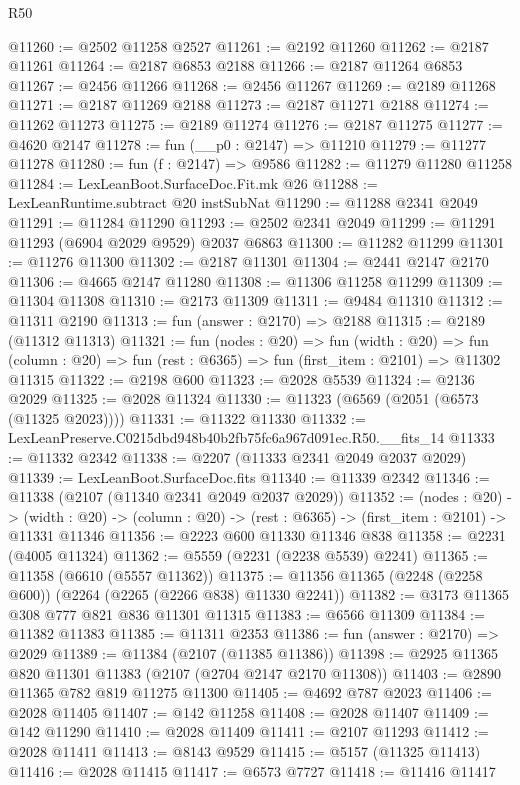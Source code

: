 \begin{lexlean}{R50}
\begin{coremodule}
@11260 := @2502 @11258 @2527
@11261 := @2192 @11260
@11262 := @2187 @11261
@11264 := @2187 @6853 @2188
@11266 := @2187 @11264 @6853
@11267 := @2456 @11266
@11268 := @2456 @11267
@11269 := @2189 @11268
@11271 := @2187 @11269 @2188
@11273 := @2187 @11271 @2188
@11274 := @11262 @11273
@11275 := @2189 @11274
@11276 := @2187 @11275
@11277 := @4620 @2147
@11278 := fun (__p0 : @2147) => @11210
@11279 := @11277 @11278
@11280 := fun (f : @2147) => @9586
@11282 := @11279 @11280 @11258
@11284 := LexLeanBoot.SurfaceDoc.Fit.mk @26
@11288 := LexLeanRuntime.subtract @20 instSubNat
@11290 := @11288 @2341 @2049
@11291 := @11284 @11290
@11293 := @2502 @2341 @2049
@11299 := @11291 @11293 (@6904 @2029 @9529) @2037 @6863
@11300 := @11282 @11299
@11301 := @11276 @11300
@11302 := @2187 @11301
@11304 := @2441 @2147 @2170
@11306 := @4665 @2147 @11280
@11308 := @11306 @11258 @11299
@11309 := @11304 @11308
@11310 := @2173 @11309
@11311 := @9484 @11310
@11312 := @11311 @2190
@11313 := fun (answer : @2170) => @2188
@11315 := @2189 (@11312 @11313)
@11321 := fun (nodes : @20) =>
  fun (width : @20) =>
  fun (column : @20) => fun (rest : @6365) => fun (first_item : @2101) => @11302 @11315
@11322 := @2198 @600
@11323 := @2028 @5539
@11324 := @2136 @2029
@11325 := @2028 @11324
@11330 := @11323 (@6569 (@2051 (@6573 (@11325 @2023))))
@11331 := @11322 @11330
@11332 := LexLeanPreserve.C0215dbd948b40b2fb75fc6a967d091ec.R50.__fits_14
@11333 := @11332 @2342
@11338 := @2207 (@11333 @2341 @2049 @2037 @2029)
@11339 := LexLeanBoot.SurfaceDoc.fits
@11340 := @11339 @2342
@11346 := @11338 (@2107 (@11340 @2341 @2049 @2037 @2029))
@11352 := (nodes : @20) ->
  (width : @20) -> (column : @20) -> (rest : @6365) -> (first_item : @2101) -> @11331 @11346
@11356 := @2223 @600 @11330 @11346 @838
@11358 := @2231 (@4005 @11324)
@11362 := @5559 (@2231 (@2238 @5539) @2241)
@11365 := @11358 (@6610 (@5557 @11362))
@11375 := @11356 @11365 (@2248 (@2258 @600)) (@2264 (@2265 (@2266 @838) @11330 @2241))
@11382 := @3173 @11365 @308 @777 @821 @836 @11301 @11315
@11383 := @6566 @11309
@11384 := @11382 @11383
@11385 := @11311 @2353
@11386 := fun (answer : @2170) => @2029
@11389 := @11384 (@2107 (@11385 @11386))
@11398 := @2925 @11365 @820 @11301 @11383 (@2107 (@2704 @2147 @2170 @11308))
@11403 := @2890 @11365 @782 @819 @11275 @11300
@11405 := @4692 @787 @2023
@11406 := @2028 @11405
@11407 := @142 @11258
@11408 := @2028 @11407
@11409 := @142 @11290
@11410 := @2028 @11409
@11411 := @2107 @11293
@11412 := @2028 @11411
@11413 := @8143 @9529
@11415 := @5157 (@11325 @11413)
@11416 := @2028 @11415
@11417 := @6573 @7727
@11418 := @11416 @11417

\end{coremodule}
\end{lexlean}
